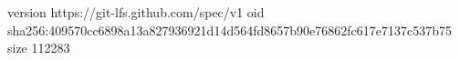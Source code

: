 version https://git-lfs.github.com/spec/v1
oid sha256:409570cc6898a13a827936921d14d564fd8657b90e76862fc617e7137c537b75
size 112283
